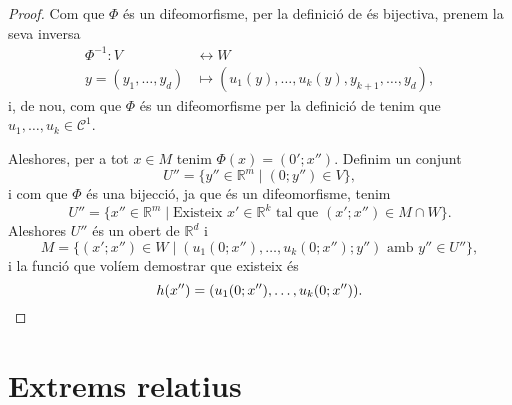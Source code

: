\documentclass[../Apunts.tex]{subfiles}
\begin{document}
\begin{theorem}
\begin{proof}
			Com que \(\Phi\) és un difeomorfisme, per la definició de  és bijectiva, prenem la seva inversa
			\begin{align*}
			\Phi^{-1}\colon V&\longleftrightarrow W\\
			y=(y_{1},\dots,y_{d})&\longmapsto(u_{1}(y),\dots,u_{k}(y),y_{k+1},\dots,y_{d}),
			\end{align*}
			i, de nou, com que \(\Phi\) és un difeomorfisme per la definició de  tenim que \(u_{1},\dots,u_{k}\in\mathcal{C}^{1}\).
			
			Aleshores, per a tot \(x\in M\) tenim \(\Phi(x)=(0';x'')\). Definim un conjunt
			\[U''=\{y''\in\mathbb{R}^{m}\mid(0;y'')\in V\},\]
			i com que \(\Phi\) és una bijecció, ja que és un difeomorfisme, tenim
			\[U''=\{x''\in\mathbb{R}^{m}\mid\text{Existeix }x'\in\mathbb{R}^{k}\text{ tal que }(x';x'')\in M\cap W\}.\]
			Aleshores \(U''\) és un obert de \(\mathbb{R}^{d}\) i %
			\[M=\{(x';x'')\in W\mid(u_{1}(0;x''),\dots,u_{k}(0;x'');y'')\text{ amb }y''\in U''\},\] %
			i la funció que volíem demostrar que existeix és
			\[h(x'')=(u_{1}(0;x''),\dots,u_{k}(0;x'')).\qedhere\]
		\end{proof}
	\end{theorem}
	\section{Extrems relatius}
\end{document}
